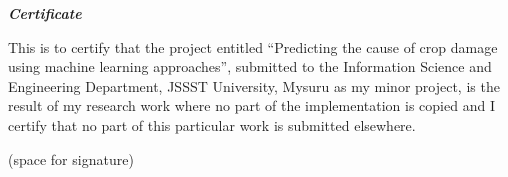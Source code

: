 \begin{center}
\emph{\LARGE\textbf {Certificate}}\\[2.5cm]
\end{center}


\doublespacing
This is to certify that the project entitled “Predicting the cause of crop damage using machine learning approaches”, submitted to the Information Science and Engineering Department, JSSST University, Mysuru as my minor project, is the result of my research work where no part of the implementation is copied and I certify that no part of this particular work is submitted elsewhere. 
\vspace*{4cm}

\hfill (space for signature)\par

